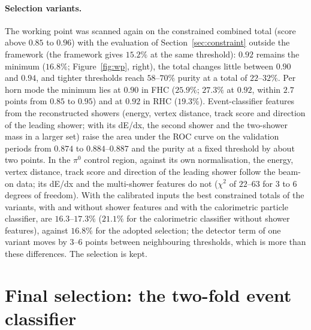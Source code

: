 \documentclass[11pt,a4paper]{article}
\begin{document}
\paragraph{Selection variants.} The working point was scanned again on the constrained combined total (score
above $0.85$ to $0.96$) with the evaluation of Section~\ref{sec:constraint} outside the framework (the framework gives
$15.2\%$ at the same threshold): $0.92$ remains the minimum ($16.8\%$; Figure~\ref{fig:wp}, right), the total changes
little between $0.90$ and $0.94$, and tighter thresholds reach $58$--$70\%$
purity at a total of $22$--$32\%$. Per horn mode the minimum lies at $0.90$ in FHC ($25.9\%$; $27.3\%$ at $0.92$,
within $2.7$ points from $0.85$ to $0.95$) and at $0.92$ in RHC ($19.3\%$). Event-classifier features from the reconstructed showers (energy, vertex
distance, track score and direction of the leading shower; with its dE/dx, the second shower and the two-shower
mass in a larger set) raise the area under the ROC curve on the validation periods from $0.874$ to $0.884$--$0.887$
and the purity at a fixed threshold by about two points. In the $\pi^0$ control region, against its own
normalisation, the energy, vertex distance, track score and direction of the leading shower follow the beam-on
data; its dE/dx and the multi-shower features do not ($\chi^2$ of $22$--$63$ for $3$ to $6$ degrees of freedom).
With the calibrated inputs the best constrained totals of the variants, with and without shower features and with
the calorimetric particle classifier, are $16.3$--$17.3\%$ ($21.1\%$ for the calorimetric classifier without
shower features), against $16.8\%$ for the adopted selection; the detector term of one variant moves by $3$--$6$
points between neighbouring thresholds, which is more than these differences. The selection is kept.

\section{Final selection: the two-fold event classifier}
\label{sec:twofold}
\end{document}
